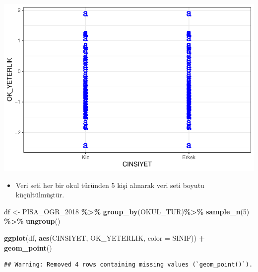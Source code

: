 \documentclass[
  oneside]{book}
\newenvironment{Shaded}{\begin{snugshade}}{\end{snugshade}}
\newcommand{\AttributeTok}[1]{\textcolor[rgb]{0.13,0.29,0.53}{#1}}
\newcommand{\DecValTok}[1]{\textcolor[rgb]{0.00,0.00,0.81}{#1}}
\newcommand{\FunctionTok}[1]{\textcolor[rgb]{0.13,0.29,0.53}{\textbf{#1}}}
\newcommand{\NormalTok}[1]{#1}
\newcommand{\OtherTok}[1]{\textcolor[rgb]{0.56,0.35,0.01}{#1}}
\newcommand{\SpecialCharTok}[1]{\textcolor[rgb]{0.81,0.36,0.00}{\textbf{#1}}}
\providecommand{\tightlist}{%
  \setlength{\itemsep}{0pt}\setlength{\parskip}{0pt}}
\begin{document}
\begin{center}\includegraphics[width=1\linewidth]{15-betimleyici-istatistik_files/figure-latex/unnamed-chunk-41-1} \end{center}

\begin{itemize}
\tightlist
\item
  Veri seti her bir okul türünden 5 kişi alınarak veri seti boyutu küçültülmüştür.
\end{itemize}

\begin{Shaded}
\begin{Highlighting}[]
\NormalTok{df }\OtherTok{\textless{}{-}}\NormalTok{ PISA\_OGR\_2018 }\SpecialCharTok{\%\textgreater{}\%} \FunctionTok{group\_by}\NormalTok{(OKUL\_TUR)}\SpecialCharTok{\%\textgreater{}\%} \FunctionTok{sample\_n}\NormalTok{(}\DecValTok{5}\NormalTok{) }\SpecialCharTok{\%\textgreater{}\%} \FunctionTok{ungroup}\NormalTok{()}

\FunctionTok{ggplot}\NormalTok{(df, }\FunctionTok{aes}\NormalTok{(CINSIYET, OK\_YETERLIK, }\AttributeTok{color =}\NormalTok{ SINIF)) }\SpecialCharTok{+}
  \FunctionTok{geom\_point}\NormalTok{()}
\end{Highlighting}
\end{Shaded}

\begin{verbatim}
## Warning: Removed 4 rows containing missing values (`geom_point()`).
\end{verbatim}
\end{document}

